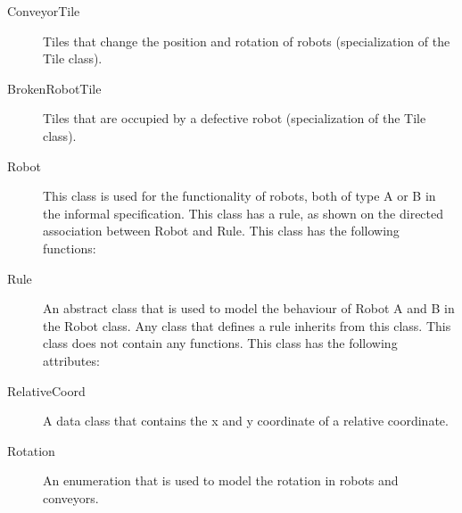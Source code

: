 \begin{description}
		\item[ConveyorTile] Tiles that change the position and rotation of robots (specialization of the Tile class).
		\item[BrokenRobotTile] Tiles that are occupied by a defective robot (specialization of the Tile class).
		\item[Robot] This class is used for the functionality of robots, both of type A or B in the informal specification. This class has a rule, as shown on the directed association between Robot and Rule. This class has the following functions:
		\item[Rule] An abstract class that is used to model the behaviour of Robot A and B in the Robot class. Any class that defines a rule inherits from this class. This class does not contain any functions. This class has the following attributes:
		\item[RelativeCoord] A data class that contains the x and y coordinate of a relative coordinate.
		\item[Rotation] An enumeration that is used to model the rotation in robots and conveyors.
	\end{description}
